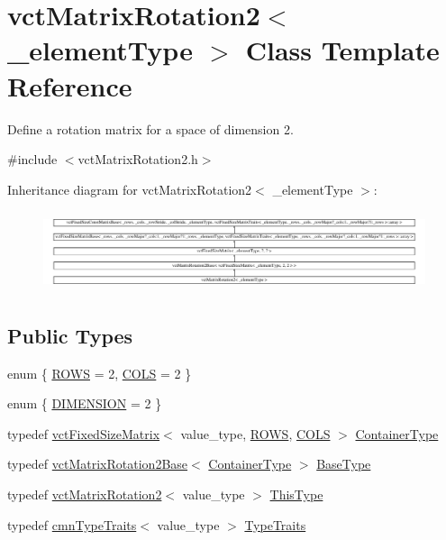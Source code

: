 \hypertarget{classvct_matrix_rotation2}{}\section{vct\+Matrix\+Rotation2$<$ \+\_\+element\+Type $>$ Class Template Reference}
\label{classvct_matrix_rotation2}


Define a rotation matrix for a space of dimension 2.  




{\ttfamily \#include $<$vct\+Matrix\+Rotation2.\+h$>$}

Inheritance diagram for vct\+Matrix\+Rotation2$<$ \+\_\+element\+Type $>$\+:\begin{figure}[H]
\begin{center}
\leavevmode
\includegraphics[height=2.366864cm]{de/def/classvct_matrix_rotation2}
\end{center}
\end{figure}
\subsection*{Public Types}
\begin{DoxyCompactItemize}
\item 
enum \{ \hyperlink{group__cisst_vector_ggac2875a62bcfe1fb310808a4aff444120a405943de2af4c1dae37a90156248a41b}{R\+O\+W\+S} = 2, 
\hyperlink{group__cisst_vector_ggac2875a62bcfe1fb310808a4aff444120a3f895b9e3be292e80920a74194301b11}{C\+O\+L\+S} = 2
 \}
\item 
enum \{ \hyperlink{group__cisst_vector_ggadb5878f342cf4be98c9e6d79e9ae359ba3641e8aa72f502ddb4dc582365767927}{D\+I\+M\+E\+N\+S\+I\+O\+N} = 2
 \}
\item 
typedef \hyperlink{classvct_fixed_size_matrix}{vct\+Fixed\+Size\+Matrix}$<$ value\+\_\+type, \hyperlink{group__cisst_vector_ggac2875a62bcfe1fb310808a4aff444120a405943de2af4c1dae37a90156248a41b}{R\+O\+W\+S}, \hyperlink{group__cisst_vector_ggac2875a62bcfe1fb310808a4aff444120a3f895b9e3be292e80920a74194301b11}{C\+O\+L\+S} $>$ \hyperlink{classvct_matrix_rotation2_ab84e040499a56ef9c8ab6b3a57e09479}{Container\+Type}
\item 
typedef \hyperlink{classvct_matrix_rotation2_base}{vct\+Matrix\+Rotation2\+Base}$<$ \hyperlink{classvct_matrix_rotation2_ab84e040499a56ef9c8ab6b3a57e09479}{Container\+Type} $>$ \hyperlink{classvct_matrix_rotation2_a6d9fad3de3e445606a22bf1a3e9da631}{Base\+Type}
\item 
typedef \hyperlink{classvct_matrix_rotation2}{vct\+Matrix\+Rotation2}$<$ value\+\_\+type $>$ \hyperlink{classvct_matrix_rotation2_a5129223265a26c20222068fee4733dd1}{This\+Type}
\item 
typedef \hyperlink{classcmn_type_traits}{cmn\+Type\+Traits}$<$ value\+\_\+type $>$ \hyperlink{classvct_matrix_rotation2_aaa741677f3a705c18adc25e022a5fa5c}{Type\+Traits}
\end{DoxyCompactItemize}
